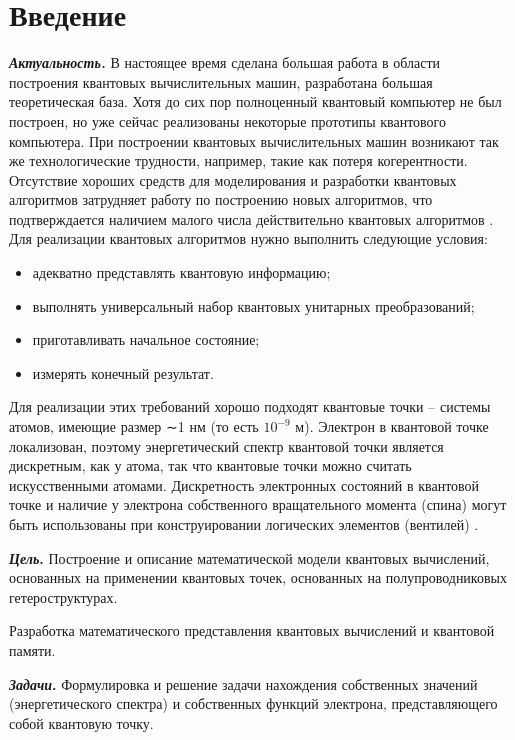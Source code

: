 \documentclass[14pt,a4paper]{PhDthesis}
\begin{document}
\section*{Введение}
\textbf{\textit{Актуальность.}} В настоящее время сделана большая работа в области построения квантовых вычислительных машин, разработана большая теоретическая база. Хотя до сих пор полноценный квантовый компьютер не был построен, но уже сейчас реализованы некоторые прототипы квантового компьютера. При построении квантовых вычислительных машин возникают так же технологические трудности, например, такие как потеря когерентности. Отсутствие хороших средств для моделирования и разработки квантовых алгоритмов затрудняет работу по построению новых алгоритмов, что подтверждается наличием малого числа действительно квантовых алгоритмов \cite{Omer:2003, Vizzotto:2010}. Для реализации квантовых алгоритмов нужно выполнить следующие условия:
\begin{itemize}
  \item адекватно представлять квантовую информацию; 
 
  \item выполнять универсальный набор квантовых унитарных преобразований;

  \item приготавливать начальное состояние;
  
  \item измерять конечный результат.
\end{itemize}
Для реализации этих требований хорошо подходят квантовые точки – системы атомов, имеющие размер ∼1 нм (то есть $10^{-9}$ м). Электрон в квантовой точке локализован, поэтому энергетический спектр квантовой точки является дискретным, как
у атома, так что квантовые точки можно считать искусственными атомами. Дискретность электронных состояний в квантовой точке и наличие у электрона собственного вращательного момента (спина) могут быть использованы при конструировании логических элементов
(вентилей) \cite{kokin:2004ru}.

\textbf{\textit{Цель}.} Построение и описание математической модели квантовых вычислений, основанных на применении квантовых точек, основанных на полупроводниковых гетероструктурах.

Разработка математического представления квантовых вычислений и квантовой памяти.

\textbf{\textit{Задачи}.} Формулировка и решение задачи нахождения собственных значений (энергетического спектра) и собственных функций электрона,
представляющего собой квантовую точку.
\end{document}
